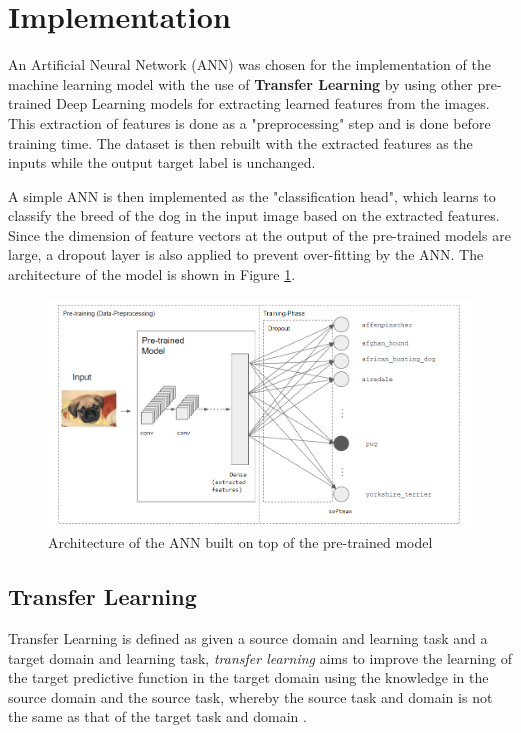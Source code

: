 \documentclass[sigconf,nonacm=true]{acmart}
\begin{document}
\section{Implementation}
An Artificial Neural Network (ANN) was chosen for the implementation of the machine learning model with the use of 
\textbf{Transfer Learning} by using other pre-trained Deep Learning models for extracting learned features from the 
images. This extraction of features is done as a "preprocessing" step and is done before training time. The dataset 
is then rebuilt with the extracted features as the inputs while the output target label is unchanged.

A simple ANN is then implemented as the "classification head", which learns to classify the breed of the dog 
in the input image based on the extracted features. Since the dimension of feature vectors at the 
output of the pre-trained models are large, a dropout layer is also applied to prevent over-fitting by the ANN.
The architecture of the model is shown in Figure \ref{fig:tlarch}.

\begin{figure}
	\centering
	\includegraphics[width=0.9\linewidth]{fig/tlarch.png}
	\caption{Architecture of the ANN built on top of the pre-trained model}
	\label{fig:tlarch}
\end{figure} 

\subsection{Transfer Learning}
Transfer Learning is defined as given a source domain and learning task and a target domain and learning task,
\textit{transfer learning} aims to improve the learning of the target predictive function in the target domain 
using the knowledge in the source domain and the source task, whereby the source task and domain is not the same 
as that of the target task and domain \cite{10.1109/TKDE.2009.191}.
\end{document}
